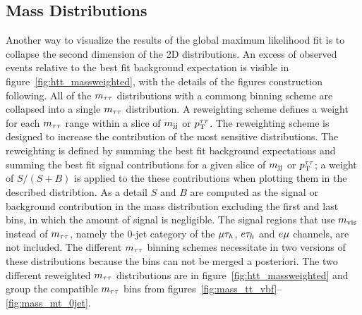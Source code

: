 \subsection{Mass Distributions}
Another way to visualize the results of the global maximum likelihood fit
is to collapse the second dimension of the 2D distributions. An excess of observed events relative 
to the best fit background expectation is visible in figure~\ref{fig:htt_massweighted},
with the details of the figures construction following.
All of the $m_{\tau\tau}$ distributions with a commong binning scheme are collapsed into a single $m_{\tau\tau}$ distribution.
A reweighting scheme defines a weight for each $m_{\tau\tau}$ range within a slice of $m_\mathrm{jj}$ or $p_\mathrm{T}^{\tau\tau}$. The reweighting
scheme is designed to increase the contribution of the most sensitive distributions. The reweighting is defined
by summing the best fit background expectations and summing the best fit signal contributions for a given slice
of $m_\mathrm{jj}$ or $p_\mathrm{T}^{\tau\tau}$; a weight of $S/(S+B)$ is applied to the these contributions when plotting them in the described
distribtion. As a detail $S$ and $B$ are computed as the signal or background contribution in the mass distribution 
excluding the first and last bins, in which the amount of signal is negligible. 
The signal regions that use $m_\text{vis}$ instead 
of $m_{\tau\tau}$, namely the 0-jet category of the $\mu\tau_{h}$, $e\tau_{h}$ and $e\mu$ channels, are not included. 
The different $m_{\tau\tau}$ binning schemes necessitate in two versions of these distributions because the bins
can not be merged a posteriori.
The two different reweighted $m_{\tau\tau}$ distributions are in figure~\ref{fig:htt_massweighted} and group the compatible 
$m_{\tau\tau}$ bins from figures~\ref{fig:mass_tt_vbf}--\ref{fig:mass_mt_0jet}.

